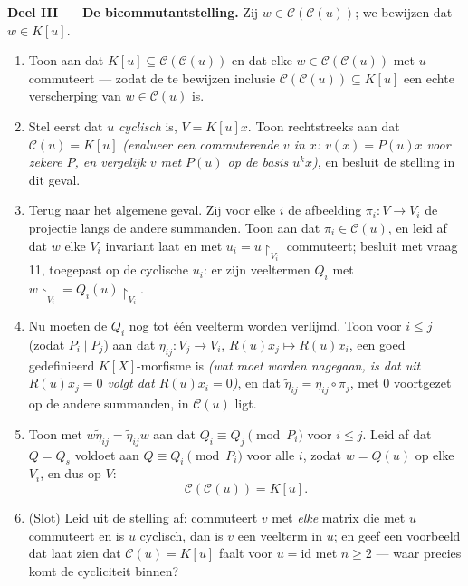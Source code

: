 \begin{problem}
\medskip
\noindent\textbf{Deel III --- De bicommutantstelling.}
Zij $w \in \mathcal C(\mathcal C(u))$; we bewijzen dat $w \in
K[u]$.
\begin{enumerate}[resume]
  \item Toon aan dat $K[u] \subseteq \mathcal C(\mathcal C(u))$ en
        dat elke $w \in \mathcal C(\mathcal C(u))$ met $u$
        commuteert --- zodat de te bewijzen inclusie $\mathcal
        C(\mathcal C(u)) \subseteq K[u]$ een echte verscherping van
        $w \in \mathcal C(u)$ is.
  \item Stel eerst dat $u$ \emph{cyclisch} is, $V = K[u]x$. Toon
        rechtstreeks aan dat $\mathcal C(u) = K[u]$ \emph{(evalueer
        een commuterende $v$ in $x$: $v(x) = P(u)x$ voor zekere
        $P$, en vergelijk $v$ met $P(u)$ op de basis $u^k x$)}, en
        besluit de stelling in dit geval.
  \item Terug naar het algemene geval. Zij voor elke $i$ de
        afbeelding $\pi_i\colon V \to V_i$ de projectie langs de
        andere summanden. Toon aan dat $\pi_i \in \mathcal C(u)$,
        en leid af dat $w$ elke $V_i$ invariant laat en met $u_i =
        u\restriction_{V_i}$ commuteert; besluit met vraag 11,
        toegepast op de cyclische $u_i$: er zijn veeltermen $Q_i$
        met $w\restriction_{V_i} = Q_i(u)\restriction_{V_i}$.
  \item Nu moeten de $Q_i$ nog tot één veelterm worden verlijmd.
        Toon voor $i \leq j$ (zodat $P_i \mid P_j$) aan dat
        $\eta_{ij} \colon V_j \to V_i$, $R(u)x_j \mapsto R(u)x_i$,
        een goed gedefinieerd $K[X]$-morfisme is \emph{(wat moet
        worden nagegaan, is dat uit $R(u)x_j = 0$ volgt dat
        $R(u)x_i = 0$)}, en dat $\tilde\eta_{ij} =
        \eta_{ij}\circ\pi_j$, met $0$ voortgezet op de andere
        summanden, in $\mathcal C(u)$ ligt.
  \item Toon met $w\tilde\eta_{ij} = \tilde\eta_{ij}w$ aan dat
        $Q_i \equiv Q_j \pmod{P_i}$ voor $i \leq j$. Leid af dat $Q
        = Q_s$ voldoet aan $Q \equiv Q_i \pmod {P_i}$ voor alle
        $i$, zodat $w = Q(u)$ op elke $V_i$, en dus op $V$:
        \[
        \boxed{\ \mathcal C(\mathcal C(u)) = K[u].\ }
        \]
  \item (Slot) Leid uit de stelling af: commuteert $v$ met
        \emph{elke} matrix die met $u$ commuteert en is $u$
        cyclisch, dan is $v$ een veelterm in $u$; en geef een
        voorbeeld dat laat zien dat $\mathcal C(u) = K[u]$ faalt
        voor $u = \mathrm{id}$ met $n \geq 2$ --- waar precies komt
        de cycliciteit binnen?
\end{enumerate}


\end{problem}
